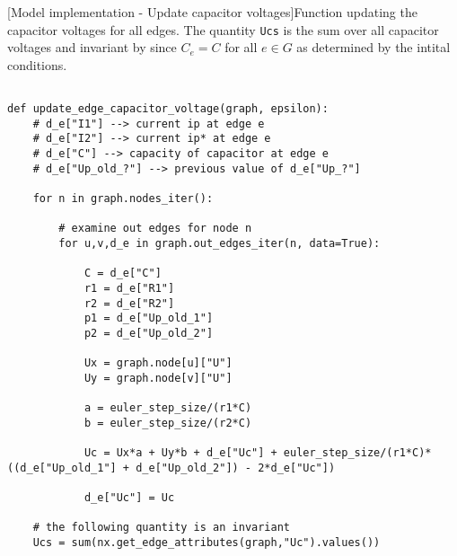 \begin{codesnippet}
[Model implementation - Update capacitor voltages]{Function updating the capacitor voltages for all edges. The quantity \texttt{Ucs} is the sum over all capacitor voltages and invariant by  since $C_e = C$ for all $e \in G$ as determined by the intital conditions.}
\label{code:capacitor_voltage}
\begin{verbatim}

def update_edge_capacitor_voltage(graph, epsilon):
	# d_e["I1"] --> current ip at edge e
	# d_e["I2"] --> current ip* at edge e
	# d_e["C"] --> capacity of capacitor at edge e
	# d_e["Up_old_?"] --> previous value of d_e["Up_?"]
	
	for n in graph.nodes_iter():

		# examine out edges for node n
		for u,v,d_e in graph.out_edges_iter(n, data=True):

			C = d_e["C"]
			r1 = d_e["R1"]
			r2 = d_e["R2"]
			p1 = d_e["Up_old_1"]
			p2 = d_e["Up_old_2"]
						
			Ux = graph.node[u]["U"]
			Uy = graph.node[v]["U"]

			a = euler_step_size/(r1*C)
			b = euler_step_size/(r2*C)
			
			Uc = Ux*a + Uy*b + d_e["Uc"] + euler_step_size/(r1*C)*((d_e["Up_old_1"] + d_e["Up_old_2"]) - 2*d_e["Uc"]) 

			d_e["Uc"] = Uc

	# the following quantity is an invariant
	Ucs = sum(nx.get_edge_attributes(graph,"Uc").values())		
\end{verbatim}


\end{codesnippet}


